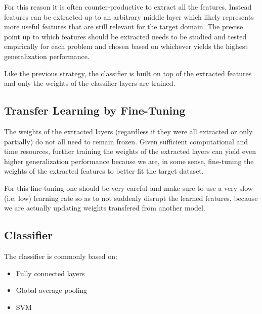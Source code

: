 For this reason it is often counter-productive to extract all the features. Instead features can be extracted up to an arbitrary middle layer which likely represents more useful features that are still relevant for the target domain. The precise point up to which features should be extracted needs to be studied and tested empirically for each problem and chosen based on whichever yields the highest generalization performance.

Like the previous strategy, the classifier is built on top of the extracted features and only the weights of the classifier layers are trained.

\subsection{Transfer Learning by Fine-Tuning}

The weights of the extracted layers (regardless if they were all extracted or only partially) do not all need to remain frozen. Given sufficient computational and time resources, further training the weights of the extracted layers can yield even higher generalization performance because we are, in some sense, fine-tuning the weights of the extracted features to better fit the target dataset.

For this fine-tuning one should be very careful and make sure to use a very slow (i.e. low) learning rate so as to not suddenly disrupt the learned features, because we are actually updating weights transfered from another model.

\subsection{Classifier}

The classifier is commonly based on:

\begin{itemize}
    \item Fully connected layers
    \item Global average pooling
    \item SVM
\end{itemize}
